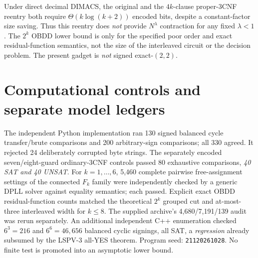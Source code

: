 \documentclass[11pt]{article}
\begin{document}
Under direct decimal DIMACS, the original and the $4k$-clause proper-3CNF reentry both require $\Theta(k\log(k+2))$ encoded bits, despite a constant-factor size saving. Thus this reentry does \emph{not} provide $N^\lambda$ contraction for any fixed $\lambda<1$. The $2^k$ OBDD lower bound is only for the specified poor order and exact residual-function semantics, not the size of the interleaved circuit or the decision problem. The present gadget is \emph{not} signed exact-$(2,2)$.

\section{Computational controls and separate model ledgers}
The independent Python implementation ran 130 signed balanced cycle transfer/brute comparisons and 200 arbitrary-sign comparisons; all 330 agreed. It rejected 24 deliberately corrupted byte strings. The separately encoded seven/eight-guard ordinary-3CNF controls passed 80 exhaustive comparisons, \emph{40 SAT and 40 UNSAT}. For $k=1,\ldots,6$, 5,460 complete pairwise free-assignment settings of the connected $F_k$ family were independently checked by a generic DPLL solver against equality semantics; each passed. Explicit exact OBDD residual-function counts matched the theoretical $2^k$ grouped cut and at-most-three interleaved width for $k\le8$. The supplied archive's 4,680/7,191/139 audit was rerun separately. An additional independent C++ enumeration checked $6^3=216$ and $6^6=46,656$ balanced cyclic signings, all SAT, a \emph{regression} already subsumed by the LSPV-3 all-YES theorem. Program seed: \texttt{21120261028}. No finite test is promoted into an asymptotic lower bound.
\end{document}
